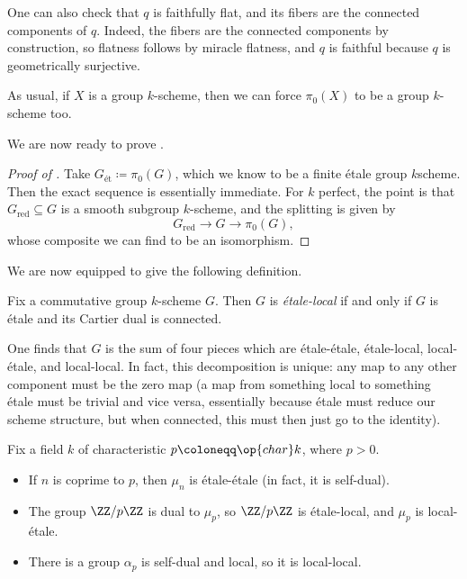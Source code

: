 \documentclass[../notes.tex]{subfiles}
\begin{document}
\begin{remark}
	One can also check that $q$ is faithfully flat, and its fibers are the connected components of $q$. Indeed, the fibers are the connected components by construction, so flatness follows by miracle flatness, and $q$ is faithful because $q$ is geometrically surjective.
\end{remark}
\begin{remark}
	As usual, if $X$ is a group $k$-scheme, then we can force $\pi_0(X)$ to be a group $k$-scheme too.
\end{remark}
We are now ready to prove .
\begin{proof}[Proof of ]
	Take $G_{\text{\'et}}\coloneqq\pi_0(G)$, which we know to be a finite \'etale group $k$scheme. Then the exact sequence is essentially immediate. For $k$ perfect, the point is that $G_{\text{red}}\subseteq G$ is a smooth subgroup $k$-scheme, and the splitting is given by
	\[G_{\text{red}}\to G\to\pi_0(G),\]
	whose composite we can find to be an isomorphism.
\end{proof}
We are now equipped to give the following definition.
\begin{defihelper} 
	Fix a commutative group $k$-scheme $G$. Then $G$ is \textit{\'etale-local} if and only if $G$ is \'etale and its Cartier dual is connected.
\end{defihelper}
\begin{remark}
	One finds that $G$ is the sum of four pieces which are \'etale-\'etale, \'etale-local, local-\'etale, and local-local. In fact, this decomposition is unique: any map to any other component must be the zero map (a map from something local to something \'etale must be trivial and vice versa, essentially because \'etale must reduce our scheme structure, but when connected, this must then just go to the identity).
\end{remark}
\begin{example}
	Fix a field $k$ of characteristic $p\coloneqq\op{char}k$, where $p>0$.
	\begin{itemize}
		\item If $n$ is coprime to $p$, then $\mu_n$ is \'etale-\'etale (in fact, it is self-dual).
		\item The group $\ZZ/p\ZZ$ is dual to $\mu_p$, so $\ZZ/p\ZZ$ is \'etale-local, and $\mu_p$ is local-\'etale.
		\item There is a group $\alpha_p$ is self-dual and local, so it is local-local.
	\end{itemize}
\end{example}
\end{document}
